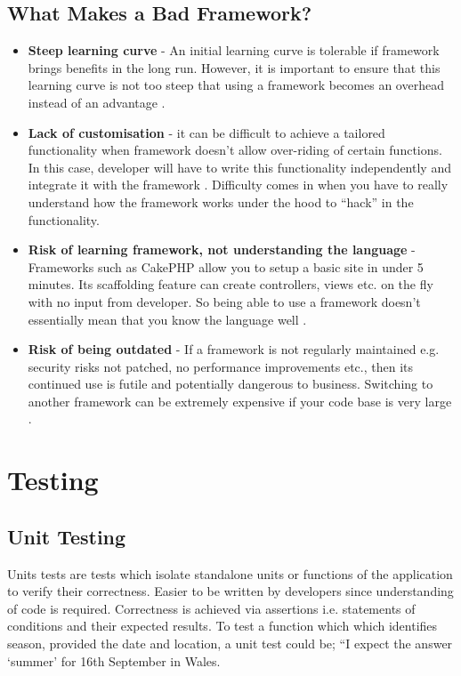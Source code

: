 \subsection{What Makes a Bad Framework?}
\label{subsec:what-makes-a-bad-framework}
\begin{itemize}
 	\item \textbf{Steep learning curve} - An initial learning curve is tolerable if framework brings benefits in the long run. However, it is important to ensure that this learning curve is not too steep that using a framework becomes an overhead instead of an advantage \cite{OSTraining}.
    \item \textbf{Lack of customisation } - it can be difficult to achieve a tailored functionality when framework doesn’t allow over-riding of certain functions. In this case, developer will have to write this functionality independently and integrate it with the framework \cite{Quora}. Difficulty comes in when you have to really understand how the framework works under the hood to “hack” in the functionality.
    \item \textbf{Risk of learning framework, not understanding the language} - Frameworks such as CakePHP allow you to setup a basic site in under 5 minutes. Its scaffolding feature can create controllers, views etc. on the fly with no input from developer. So being able to use a framework doesn't essentially mean that you know the language well \cite{Vizteams}.
    \item \textbf{Risk of being outdated} - If a framework is not regularly maintained e.g. security risks not patched, no performance improvements etc., then its continued use is futile and potentially dangerous to business. Switching to another framework can be extremely expensive if your code base is very large \cite{Quora}.\\ 
\end{itemize}
    
\section{Testing}
\label{sec:testing}

\subsection{Unit Testing}
\label{subsec:unit-testing}

Units tests are tests which isolate standalone units or functions of the application to verify their correctness. Easier to be written by developers since understanding of code is required. Correctness is achieved via assertions i.e. statements of conditions and their expected results. To test a function which which identifies season, provided the date and location, a unit test could be; “I expect the answer ‘summer’ for 16th September in Wales. \\

